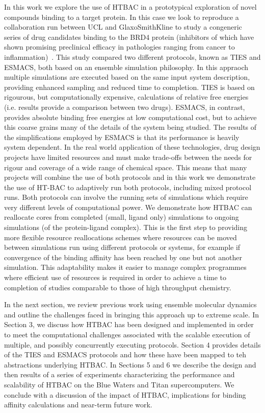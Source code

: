 In this work we explore the use of HTBAC in a prototypical exploration of novel 
compounds binding to a target protein.
In this case we look to reproduce a collaboration run between UCL and GlaxoSmithKline 
to study a congeneric series of drug candidates binding to the BRD4 protein (inhibitors 
of which have shown promising preclinical efficacy in pathologies ranging from cancer to
inflammation)~\cite{Wan2017brd4}.
This study compared two different protocols, known as TIES and ESMACS, both based on an 
ensemble simulation philosophy.
In this appraoch multiple simulations are executed based on the same input system description, 
providing enhanced sampling and reduced time to completion.
TIES is based on rigourous, but computationally expensive, calculations of relative free
energies (i.e. results provide a comparison between two drugs).
ESMACS, in contrast, provides absolute binding free energies at low computational cost, 
but to achieve this coarse grains many of the details of the system being studied.
The results of the simplifications employed by ESMACS is that its performance is heavily 
system dependent.
In the real world application of these technologies, drug design 
projects have limited resources and must make trade-offs between the needs for rigour
and coverage of a wide range of chemical space. 
This means that many projects will combine the use of both protocols and in this work we 
demonstrate the use of HT-BAC to adaptively run both protocols, including mixed protocol runs.
Both protocols can involve the running sets of simulations which require very different levels 
of computational power.
We demonstrate how HTBAC can reallocate cores from completed (small, ligand only) simulations 
to ongoing simulations (of the protein-ligand complex).
This is the first step to providing more flexible resource reallocations schemes where 
resources can be moved between simulations run using different protocols or systems, 
for example if convergence of the binding affinity has been reached by one but not another
simulation.
This adaptability makes it easier to manage complex programmes where efficient use of 
resources is required in order to achieve a time to completion of studies comparable 
to those of high throughput chemistry.

In the next section, we review previous work using ensemble molecular dynamics and outline 
the challenges faced in bringing this approach up to extreme scale.
In Section 3, we discuss how HTBAC has been designed and implemented in order to meet the 
computational challenges associated with the scalable execution of multiple, and possibly 
concurrently executing protocols. 
Section 4 provides details of the TIES and ESMACS protocols and how these have been mapped 
to teh abstractions underlying HTBAC. 
In Sections 5 and 6 we describe the design and then results of a series of experiments 
characterizing the performance and scalability of HTBAC on the Blue Waters and Titan 
supercomputers.
We conclude with a discussion of the impact of HTBAC, implications for binding
affinity calculations and near-term future work.
